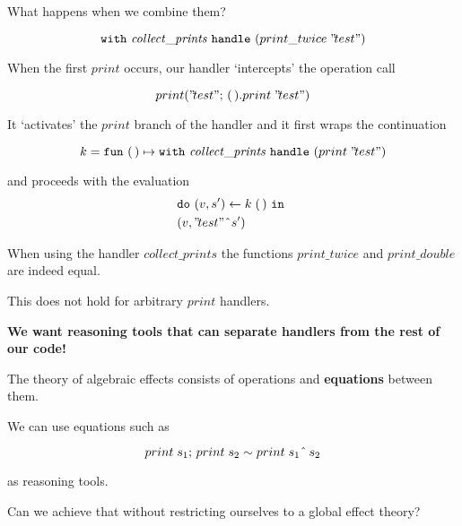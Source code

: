 \documentclass[usenames,dvipsnames]{beamer}
\begin{document}
\begin{frame}

	What happens when we combine them?
	\pause

	\[ \mathtt{with}~{\mathit{collect\_prints}}~\mathtt{handle}~{({print\_twice}\;{"\!test"})} \]
	\pause

	When the first $print$ occurs, our handler `intercepts' the operation call

	\[ \operation[print]{"\!test"}{\unit.\apply{print}{"\!test"}} \]
	\pause

	It `activates' the $print$ branch of the handler and it first wraps the continuation

	\[
		k = \mathtt{fun}~{\mathtt{(\,)}} \mapsto{\mathtt{with}~{\mathit{collect\_prints}}~\mathtt{handle}~{({print}\;{"\!test"})}}
	\]

	\pause

	and proceeds with the evaluation
	\begin{align*}
		&\mathtt{do}~{(v, s')} \leftarrow{{k}\;{\mathtt{(\,)}}}~\mathtt{in}~\\
		&(v, "\!test"\;\hat{}\; s')
	\end{align*} 


\end{frame}
\begin{frame}
	When using the handler $\mathit{collect\_prints}$ the functions $print\_twice$ and $print\_double$ are indeed equal.

	\vspace{5mm}

	This does not hold for arbitrary $print$ handlers.

	\pause
	\vspace{5mm}

	\textbf{We want reasoning tools that can separate handlers from the rest of our code!}
\end{frame}
\begin{frame}
	The theory of algebraic effects consists of operations and \textbf{equations} between them.

	\vspace{5mm}

	We can use equations such as

	\[
		{print}\;{s_1};\, {print}\;{s_2} \sim {print}\;{s_1  \;\hat{}\; \, s_2}
	\]

	as reasoning tools.

	\vspace{5mm}

	\pause

	Can we achieve that without restricting ourselves to a global effect theory?

\end{frame}
\end{document}
